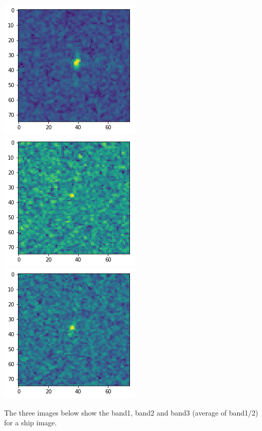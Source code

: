 \documentclass{article}
\begin{document}
\includegraphics[scale=0.33]{heatmap-iceberg-band-1}
\includegraphics[scale=0.33]{heatmap-iceberg-band-2}
\includegraphics[scale=0.33]{heatmap-iceberg-band3-avg}

The three images below show the band1, band2 and band3 (average of band1/2) for a ship image.
\end{document}
